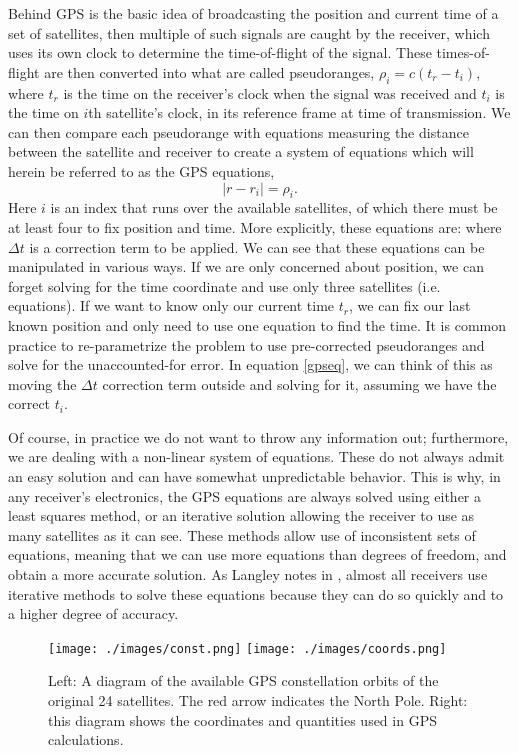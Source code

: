 Behind GPS is the basic idea of broadcasting the position and current time of a set of satellites, then multiple of such signals are caught by the receiver, which uses its own clock to determine the time-of-flight of the signal. These times-of-flight are then converted into what are called pseudoranges, $\rho_i=c(t_{r}-t_{i})$, where $t_r$ is the time on the receiver's clock when the signal was received and $t_i$ is the time on $i$th satellite's clock, in its reference frame at time of transmission. We can then compare each pseudorange with equations measuring the distance between the satellite and receiver to create a system of equations which will herein be referred to as the GPS equations,
$$
|r-r_i|=\rho_i.
$$
Here $i$ is an index that runs over the available satellites, of which there must be at least four to fix position and time. More explicitly, these equations are:
where $\Delta t$ is a correction term to be applied. We can see that these equations can be manipulated in various ways. If we are only concerned about position, we can forget solving for the time coordinate and use only three satellites (i.e. equations). If we want to know only our current time $t_r$, we can fix our last known position and only need to use one equation to find the time. It is common practice to re-parametrize the problem to use pre-corrected pseudoranges and solve for the unaccounted-for error. In equation \ref{gpseq}, we can think of this as moving the $\Delta t$ correction term outside and solving for it, assuming we have the correct $t_i$. 

Of course, in practice we do not want to throw any information out; furthermore, we are dealing with a non-linear system of equations. These do not always admit an easy solution and can have somewhat unpredictable behavior. This is why, in any receiver's electronics, the GPS equations are always solved using either a least squares method, or an iterative solution allowing the receiver to use as many satellites as it can see. These methods allow use of inconsistent sets of equations, meaning that we can use more equations than degrees of freedom, and obtain a more accurate solution. As Langley notes in \cite{gpsworld}, almost all receivers use iterative methods to solve these equations because they can do so quickly and to a higher degree of accuracy. 
\begin{figure}[h!]
\begin{center}
\texttt{[image: ./images/const.png]}
\texttt{[image: ./images/coords.png]}
\caption[GPS Diagrams]{Left: A diagram of the available GPS constellation orbits of the original 24 satellites. The red arrow indicates the North Pole. Right: this diagram shows the coordinates and quantities used in GPS calculations.}
\label{const}
\end{center}
\end{figure}
